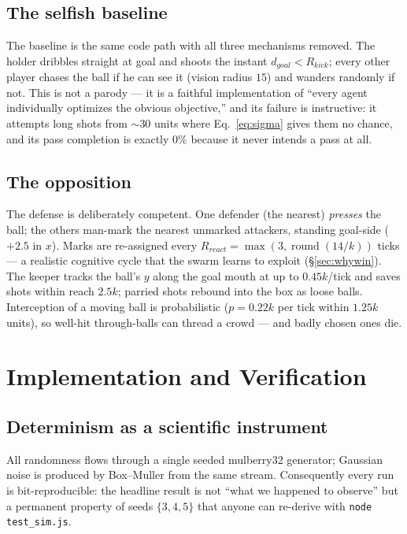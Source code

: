 \documentclass[11pt,a4paper]{article}
\begin{document}
\subsection{The selfish baseline}

The baseline is the same code path with all three mechanisms removed. The holder dribbles
straight at goal and shoots the instant $d_{goal} < R_{kick}$; every other player chases the
ball if he can see it (vision radius $15$) and wanders randomly if not. This is not a parody ---
it is a faithful implementation of ``every agent individually optimizes the obvious objective,''
and its failure is instructive: it attempts long shots from $\sim$30 units where
Eq.~\eqref{eq:sigma} gives them no chance, and its pass completion is exactly $0\%$ because it
never intends a pass at all.

\subsection{The opposition}

The defense is deliberately competent. One defender (the nearest) \emph{presses} the ball; the
others man-mark the nearest unmarked attackers, standing goal-side ($+2.5$ in $x$). Marks are
re-assigned every $R_{react} = \max(3, \operatorname{round}(14/k))$ ticks --- a realistic
cognitive cycle that the swarm learns to exploit (\S\ref{sec:whywin}). The keeper tracks the
ball's $y$ along the goal mouth at up to $0.45k$/tick and saves shots within reach $2.5k$;
parried shots rebound into the box as loose balls. Interception of a moving ball is
probabilistic ($p = 0.22k$ per tick within $1.25k$ units), so well-hit through-balls can thread
a crowd --- and badly chosen ones die.

\section{Implementation and Verification}\label{sec:impl}

\subsection{Determinism as a scientific instrument}

All randomness flows through a single seeded mulberry32 generator; Gaussian noise is produced by
Box--Muller from the same stream. Consequently every run is bit-reproducible: the headline
result is not ``what we happened to observe'' but a permanent property of seeds $\{3,4,5\}$ that
anyone can re-derive with \texttt{node test\_sim.js}.
\end{document}

